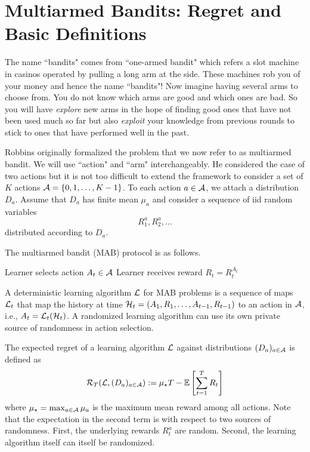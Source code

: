 \documentclass[11pt]{article}
\begin{document}
\section{Multiarmed Bandits: Regret and Basic Definitions}

The name ``bandits" comes from ``one-armed bandit" which refers a slot machine in casinos operated by pulling a long arm at the side. These machines rob you of your money and hence the name ``bandits"!
Now imagine having several arms to choose from. You do not know which arms are good and which ones are bad. So you will have \emph{explore} new arms in the hope of finding good ones that have not been used much
so far but also \emph{exploit} your knowledge from previous rounds to stick to ones that have performed well in the past.

Robbins \cite{robbins1952some} originally formalized the problem that we now refer to as multiarmed bandit. We will use ``action" and ``arm" interchangeably. He considered the case of two actions
but it is not too difficult to extend the framework to consider a set of $K$ actions $\mathcal{A} = \{0,1,\ldots,K-1\}$. To each action $a \in \mathcal{A}$, we attach a distribution $D_a$. Assume that $D_a$ has finite mean $\mu_a$ and
consider a sequence of iid random variables
\[
R^a_1,R^a_2,\ldots
\]
distributed according to $D_a$.

The multiarmed bandit (MAB) protocol is as follows.

\begin{algorithmic}[1]
\STATE Learner selects action $A_t \in \mathcal{A}$
\STATE Learner receives reward $R_t = R^{A_t}_t$
\ENDFOR
\end{algorithmic}

A deterministic learning algorithm $\mathcal{L}$ for MAB problems is a sequence of maps $\mathcal{L}_t$ that map the history at time $\mathcal{H}_t = (A_1,R_1,\ldots,A_{t-1},R_{t-1})$ to an action in $\mathcal{A}$, i.e.,
$A_t = \mathcal{L}_t(\mathcal{H}_t)$. A randomized learning algorithm can use its own private source of randomness in action selection.

The expected regret of a learning algorithm $\mathcal{L}$ against distributions $(D_a)_{a \in \mathcal{A}}$ is defined as
\begin{equation}\label{eq:mabregret}
\mathcal{R}_T(\mathcal{L}, (D_a)_{a \in \mathcal{A}}) := \mu_\star T - \mathbb{E}\left[ \sum_{t=1}^T R_t \right]
\end{equation}
where $\mu_\star = \max_{a \in \mathcal{A}} \mu_a$ is the maximum mean reward among all actions. Note that the expectation in the second term is with respect to two sources of randomness.
First, the underlying rewards $R^a_t$ are random. Second, the learning algorithm itself can itself be randomized.
\end{document}
